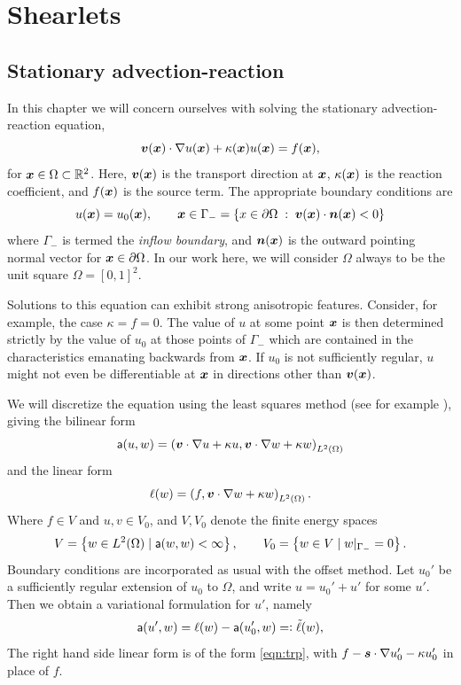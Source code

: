 \chapter{Shearlets}

\label{chap:shearlets}

\section{Stationary advection-reaction} \label{sec:eqndiscr}

In this chapter we will concern ourselves with solving the stationary advection-reaction equation,
\begin{equation} \label{eqn:trp}
{\bm v}({\bm x})\cdot\nabla u({\bm x}) + \kappa({\bm x})u({\bm x}) = f({\bm x}),
\end{equation}
for ${\bm x}\in\Omega\subset\mathbb{R}^2$. Here, ${\bm v}({\bm x})$ is the transport direction at ${\bm x}$, $\kappa({\bm x})$ is the
reaction coefficient, and $f({\bm x})$ is the source term. The appropriate boundary conditions are
\[
    u({\bm x}) = u_0({\bm x}), \qquad {\bm x}\in\Gamma_- = \{x \in \partial\Omega \;:\; {\bm v}({\bm x})\cdot {\bm n}({\bm x}) < 0\}
\]
where $\Gamma_-$ is termed the {\em inflow boundary}, and ${\bm n}({\bm x})$ is the outward pointing normal vector for
${\bm x}\in\partial\Omega$. In our work here, we will consider $\Omega$ always to be the unit square
$\Omega=[0,1]^2$.

Solutions to this equation can exhibit strong anisotropic features. Consider, for example, the case
$\kappa=f=0$. The value of $u$ at some point ${\bm x}$ is then determined strictly by the value of $u_0$ at those
points of $\Gamma_-$ which are contained in the characteristics emanating backwards from ${\bm x}$. If $u_0$ is
not sufficiently regular, $u$ might not even be differentiable at ${\bm x}$ in directions other than ${\bm v}({\bm x})$.

We will discretize the equation using the least squares method (see for example \cite{Widmer08}), giving the
bilinear form
\[ 
    {\sf a}(u,w) = \left({\bm v}\cdot\nabla u + \kappa u, {\bm v}\cdot\nabla w + \kappa w\right)_{L^2(\Omega)}
\]
and the linear form
\begin{equation} \label{eqn:ell}
    {\ell}(w) = \left(f, {\bm v}\cdot\nabla w + \kappa w\right)_{L^2(\Omega)}.
\end{equation}
Where $f\in V$ and $u,v \in V_0$, and $V,V_0$ denote the finite energy spaces
\[
    V   = \left\{ w \in L^2(\Omega) \;|\; {\sf a}(w,w) < \infty \right\}, \qquad
    V_0 = \left\{ w \in V \;|\; w|_{\Gamma_-} = 0 \right\}.
\]
Boundary conditions are incorporated as usual with the offset method. Let $u_0'$ be a sufficiently regular
extension of $u_0$ to $\Omega$, and write $u=u_0' + u'$ for some $u'$. Then we obtain a variational
formulation for $u'$, namely
\[
    {\sf a}(u',w) = \ell(w) - {\sf a}(u_0',w) =\vcentcolon \tilde{\ell}(w),
\]
The right hand side linear form is of the form \eqref{eqn:trp}, with $f - {\bm s}\cdot\nabla u_0' - \kappa u_0'$
in place of $f$.

